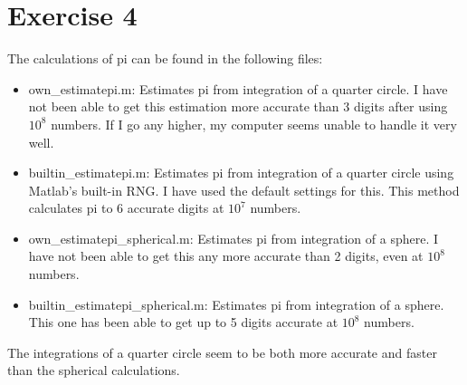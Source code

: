 \section*{Exercise 4}
The calculations of pi can be found in the following files:
\begin{itemize}
	\item own\_estimatepi.m: Estimates pi from integration of a quarter circle. I have not been able to get this estimation more accurate than 3 digits after using $10^{8}$ numbers. If I go any higher, my computer seems unable to handle it very well.
	\item builtin\_estimatepi.m: Estimates pi from integration of a quarter circle using Matlab's built-in RNG. I have used the default settings for this. This method calculates pi to 6 accurate digits at $10^{7}$ numbers.
	\item own\_estimatepi\_spherical.m: Estimates pi from integration of a sphere. I have not been able to get this any more accurate than 2 digits, even at $10^{8}$ numbers.
	\item builtin\_estimatepi\_spherical.m: Estimates pi from integration of a sphere. This one has been able to get up to 5 digits accurate at $10^{8}$ numbers.
\end{itemize}
The integrations of a quarter circle seem to be both more accurate and faster than the spherical calculations.